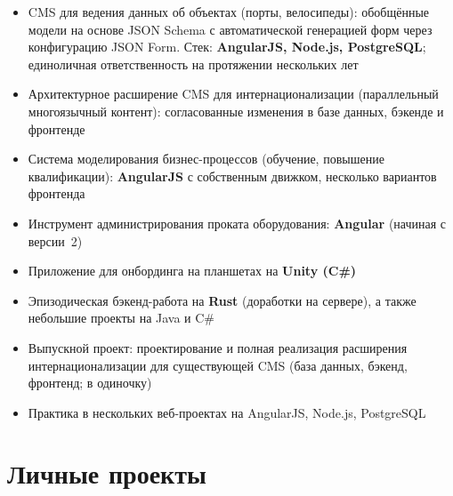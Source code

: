 \begin{itemize}
  \item CMS для ведения данных об объектах (порты, велосипеды): обобщённые модели на основе JSON Schema с автоматической генерацией форм через конфигурацию JSON Form. Стек: \textbf{AngularJS, Node.js, PostgreSQL}; единоличная ответственность на протяжении нескольких лет
  \item Архитектурное расширение CMS для интернационализации (параллельный многоязычный контент): согласованные изменения в базе данных, бэкенде и фронтенде
  \item Система моделирования бизнес-процессов (обучение, повышение квалификации): \textbf{AngularJS} с собственным движком, несколько вариантов фронтенда
  \item Инструмент администрирования проката оборудования: \textbf{Angular} (начиная с версии~2)
  \item Приложение для онбординга на планшетах на \textbf{Unity (C\#)}
  \item Эпизодическая бэкенд-работа на \textbf{Rust} (доработки на сервере), а также небольшие проекты на Java и C\#
\end{itemize}

\begin{itemize}
  \item Выпускной проект: проектирование и полная реализация расширения интернационализации для существующей CMS (база данных, бэкенд, фронтенд; в одиночку)
  \item Практика в нескольких веб-проектах на AngularJS, Node.js, PostgreSQL
\end{itemize}

\section*{Личные проекты}

